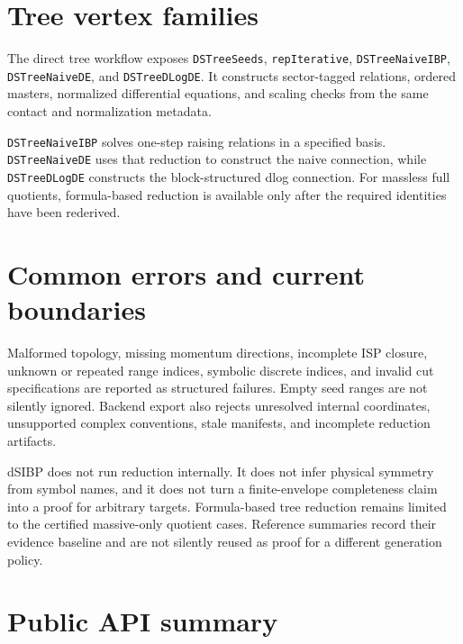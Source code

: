 ﻿\documentclass[a4paper,11pt]{article}
\begin{document}
\section{Tree vertex families}

The direct tree workflow exposes \texttt{DSTreeSeeds}, \texttt{repIterative},
\texttt{DSTreeNaiveIBP}, \texttt{DSTreeNaiveDE}, and \texttt{DSTreeDLogDE}. It constructs
sector-tagged relations, ordered masters, normalized differential equations, and scaling
checks from the same contact and normalization metadata.

\texttt{DSTreeNaiveIBP} solves one-step raising relations in a specified basis.
\texttt{DSTreeNaiveDE} uses that reduction to construct the naive connection, while
\texttt{DSTreeDLogDE} constructs the block-structured dlog connection. For massless full
quotients, formula-based reduction is available only after the required identities have
been rederived.

\section{Common errors and current boundaries}

Malformed topology, missing momentum directions, incomplete ISP closure, unknown or
repeated range indices, symbolic discrete indices, and invalid cut specifications are
reported as structured failures. Empty seed ranges are not silently ignored. Backend export
also rejects unresolved internal coordinates, unsupported complex conventions, stale
manifests, and incomplete reduction artifacts.

dSIBP does not run reduction internally. It does not infer physical symmetry from symbol
names, and it does not turn a finite-envelope completeness claim into a proof for arbitrary
targets. Formula-based tree reduction remains limited to the certified massive-only
quotient cases. Reference summaries record their evidence baseline and are not silently
reused as proof for a different generation policy.

\section{Public API summary}
\end{document}
